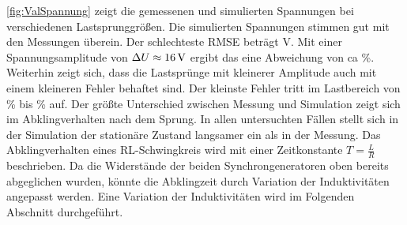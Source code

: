 \cref{fig:ValSpannung} zeigt die gemessenen und simulierten Spannungen bei verschiedenen Lastsprunggrößen. Die simulierten Spannungen stimmen gut mit den Messungen überein. Der schlechteste RMSE beträgt \unit[1,33]{V}. Mit einer Spannungsamplitude von $\Delta U\approx\unit[16]{V}$ ergibt das eine Abweichung von ca \unit[8,3]{\%}. Weiterhin zeigt sich, dass  die Lastsprünge mit kleinerer Amplitude auch mit einem kleineren Fehler behaftet sind. Der kleinste Fehler tritt im Lastbereich von \unit[50]{\%} bis \unit[100]{\%} auf. Der größte Unterschied zwischen Messung und Simulation zeigt sich im Abklingverhalten nach dem Sprung. In allen untersuchten Fällen stellt sich in der Simulation der stationäre Zustand langsamer ein als in der Messung. Das Abklingverhalten eines RL-Schwingkreis wird mit einer Zeitkonstante $T=\frac{L}{R}$ beschrieben. Da die Widerstände der beiden Synchrongeneratoren oben bereits abgeglichen wurden, könnte die Abklingzeit durch Variation der Induktivitäten angepasst werden. Eine Variation der Induktivitäten wird im Folgenden Abschnitt durchgeführt.
